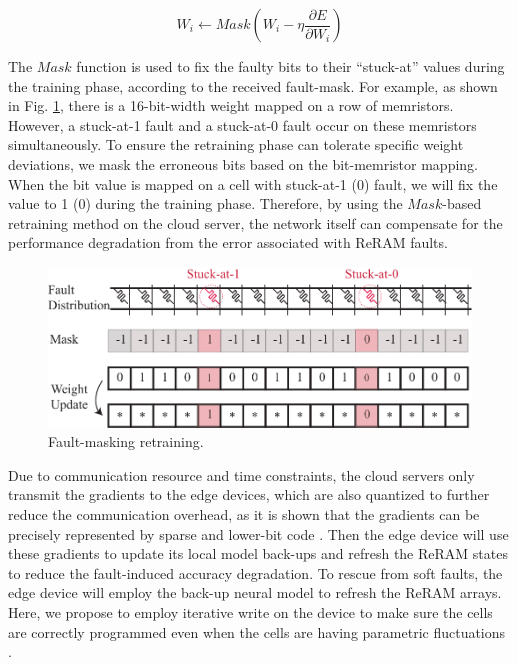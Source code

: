 \begin{equation} 
    {W_{i}} \leftarrow Mask({W_{i}} - \eta \frac{{\partial E}}{{\partial {W_{i}}}})
\end{equation}
                                                                                                        
The $Mask$ function is used to fix the faulty bits to their “stuck-at” values during the training phase, according to the received fault-mask. For example, as shown in Fig. \ref{fig:faultmask}, there is a 16-bit-width weight mapped on a row of memristors. However, a stuck-at-1 fault and a stuck-at-0 fault occur on these memristors simultaneously. To ensure the retraining phase can tolerate specific weight deviations, we mask the erroneous bits based on the bit-memristor mapping. When the bit value is mapped on a cell with stuck-at-1 (0) fault, we will fix the value to 1 (0) during the training phase. Therefore, by using the $Mask$-based retraining method on the cloud server, the network itself can compensate for the performance degradation from the error associated with ReRAM faults.
                                                                                                                        
\begin{figure}                                                                                                         
    \centering
    \includegraphics[width=1\linewidth]{images/OL-fig7}
    \caption{Fault-masking retraining.}
    \label{fig:faultmask} 
    \vspace {-15pt}
\end{figure}
                                                                                                                                                                                
Due to communication resource and time constraints, the cloud servers only transmit the gradients to the edge devices, which are also quantized to further reduce the communication overhead, as it is shown that the gradients can be precisely represented by sparse and lower-bit code \cite{NIPS2017_6749}. Then the edge device will use these gradients to update its local model back-ups and refresh the ReRAM states to reduce the fault-induced accuracy degradation.  To rescue from soft faults, the edge device will employ the back-up neural model to refresh the ReRAM arrays. Here, we propose to employ iterative write on the device to make sure the cells are correctly programmed even when the cells are having parametric fluctuations \cite{5482157}.
                                                                                                                                                                
